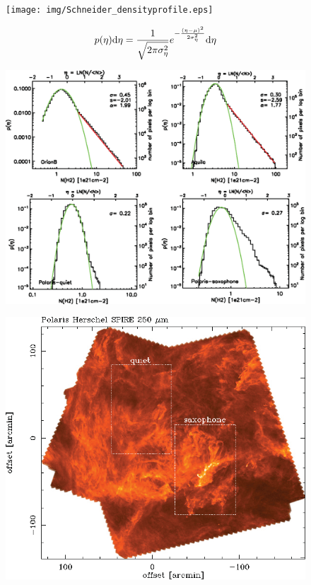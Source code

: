 \documentclass[12pt]{article}
\newcommand{\dd}{{\rm d}}
\begin{document}
    \begin{figure}[hb]
              \centering
              \texttt{[image: img/Schneider\_densityprofile.eps]}
    \end{figure} 
\clearpage
    \begin{equation}
        p(\eta)\dd \eta = \frac{1}{\sqrt{2\pi \sigma^2_{\eta}}}e^{-\frac{(\eta-\mu)^2}{2\sigma^2_\eta}} \dd \eta
    \end{equation}
    \begin{figure}[hb]
              \centering
              \includegraphics[totalheight=70 mm]{img/Schneider_pdf.eps}
    \end{figure} 
\clearpage

    \begin{figure}[hb]
              \centering
              \includegraphics[totalheight=80 mm]{img/Schneider_polaris.eps}
    \end{figure} 
\end{document}
